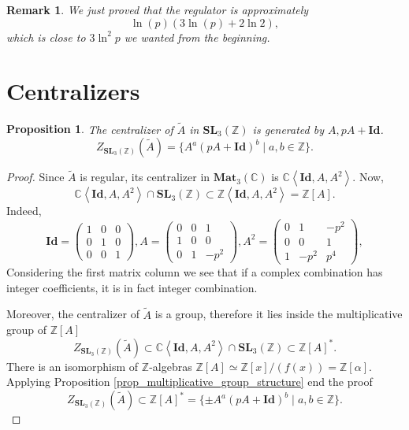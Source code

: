\documentclass[a4paper]{article}
\newtheorem{Prop}[Thm]{Proposition}
\newtheorem{Rem}[Thm]{Remark}
\newcommand{\C}{\mathbb{C}}        %
\newcommand{\Id}{\mathbf{Id}}        %
\newcommand{\SL}{\mathbf{SL}_3(\mathbb{Z})}        %
\newcommand{\Mat}{\mathbf{Mat}_3(\mathbb{C})}        %
\begin{document}
\begin{Rem}
We just proved that the regulator is approximately 
\[
\ln(p) ( 3 \ln(p) + 2 \ln 2 )
,\] 
which is close to $3 \ln^2 p$ we wanted from the beginning.
\end{Rem}

\section{Centralizers}
\begin{Prop}
The centralizer of $\tilde A$ in $\SL$
is generated by $A, p A+\Id$.
$$Z_{\SL}(\tilde A) = \{ A^a (p A + \Id)^b \mid a, b \in \mathbb{Z} \} .$$ 
\end{Prop}
\begin{proof}
Since $\tilde A$ is regular, its centralizer in $ \Mat $ is $\C \left< \Id, A, A^2 \right> $.
Now, 
\[
\C \left< \Id, A, A^2 \right> \cap \SL 
\subset \mathbb{Z} 
\left< \Id, A, A^2 \right> = \mathbb{Z}[A]
.\] 
Indeed,
\begin{equation}
\Id = 
\begin{pmatrix}
1 & 0 & 0 \\
0 & 1 & 0 \\
0 & 0 & 1
\end{pmatrix}, 
A = 
\begin{pmatrix}
0 & 0 & 1 \\
1 & 0 & 0 \\
0 & 1 & -p^2
\end{pmatrix}, 
A^2 = 
\begin{pmatrix}
0 & 1 & -p^2 \\
0 & 0 & 1 \\
1 & -p^2 & p^4
\end{pmatrix}, 
\end{equation}
Considering the first matrix column we see that if a complex combination has integer coefficients, it is in fact integer combination.

Moreover, 
the centralizer of $\tilde A$ is a group, therefore it lies inside the multiplicative group of $\mathbb{Z}[A]$
\[
Z_{\SL}(\tilde A)  \subset 
\C \left< \Id, A, A^2 \right> \cap \SL 
\subset \mathbb{Z}[A]^*
.\] 
There is an isomorphism of $\mathbb{Z}$-algebras $\mathbb{Z}[A] \simeq \mathbb{Z}[x]/(f(x)) = \mathbb{Z}[\alpha]$.
Applying Proposition \ref{prop_multiplicative_group_structure} end the proof
\[
Z_{\SL}(\tilde A) 
\subset \mathbb{Z}[A]^* =\{ \pm A^a (p A + \Id)^b \mid a, b \in \mathbb{Z} \}.\] 
\end{proof}
\end{document}
